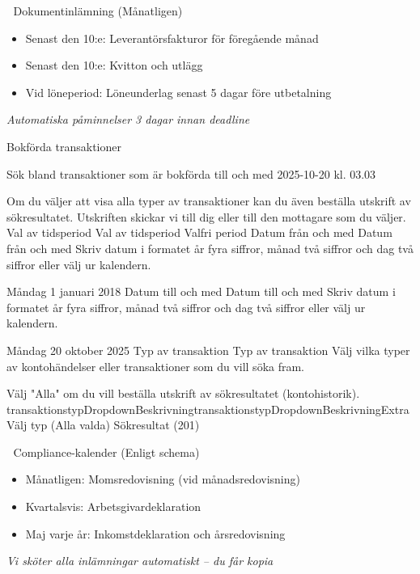 \documentclass[10pt]{beamer}
\begin{document}
\begin{frame}[fragile]
  \vspace{0.3cm}

  \begin{block}{📄 Dokumentinlämning (Månatligen)}
    \footnotesize
    \begin{itemize}
      \item Senast den 10:e: Leverantörsfakturor för föregående månad
      \item Senast den 10:e: Kvitton och utlägg
      \item Vid löneperiod: Löneunderlag senast 5 dagar före utbetalning
    \end{itemize}
    \textit{Automatiska påminnelser 3 dagar innan deadline}
  \end{block}Bokförda transaktioner

Sök bland transaktioner som är bokförda till och med 2025-10-20 kl. 03.03

Om du väljer att visa alla typer av transaktioner kan du även beställa utskrift av sökresultatet. Utskriften skickar vi till dig eller till den mottagare som du väljer.
Val av tidsperiod Val av tidsperiod
Valfri period
Datum från och med Datum från och med
Skriv datum i formatet år fyra siffror, månad två siffror och dag två siffror eller välj ur kalendern.

Måndag 1 januari 2018
Datum till och med Datum till och med
Skriv datum i formatet år fyra siffror, månad två siffror och dag två siffror eller välj ur kalendern.

Måndag 20 oktober 2025
Typ av transaktion Typ av transaktion
Välj vilka typer av kontohändelser eller transaktioner som du vill söka fram.

Välj "Alla" om du vill beställa utskrift av sökresultatet (kontohistorik).
transaktionstypDropdownBeskrivningtransaktionstypDropdownBeskrivningExtra
Välj typ (Alla valda)
Sökresultat (201)


  \vspace{0.3cm}

  \begin{block}{📅 Compliance-kalender (Enligt schema)}
    \footnotesize
    \begin{itemize}
      \item Månatligen: Momsredovisning (vid månadsredovisning)
      \item Kvartalsvis: Arbetsgivardeklaration
      \item Maj varje år: Inkomstdeklaration och årsredovisning
    \end{itemize}
    \textit{Vi sköter alla inlämningar automatiskt – du får kopia}
  \end{block}

  \vspace{0.5cm}
  \begin{flushright}
  \end{flushright}

\end{frame}
\end{document}
